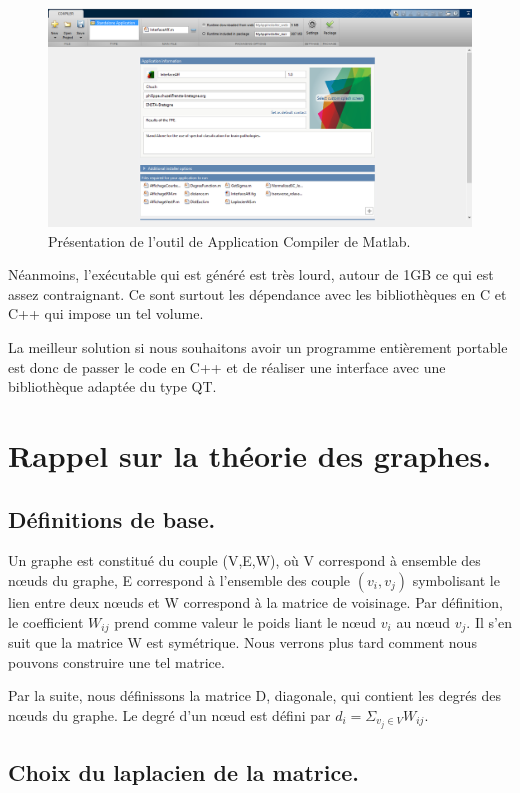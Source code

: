 \begin{figure}[H]
\centering
    \includegraphics[scale=0.4,angle=0]{Images/StandAlone.png}
    \caption{Présentation de l'outil de Application Compiler de Matlab.}
    \label{fig:Compiler}
\end{figure} 

Néanmoins, l'exécutable qui est généré est très lourd, autour de 1GB ce qui est assez contraignant. Ce sont surtout les dépendance avec les bibliothèques en C et C++ qui impose un tel volume.

La meilleur solution si nous souhaitons avoir un programme entièrement portable est donc de passer le code en C++ et de réaliser une interface avec une bibliothèque adaptée du type QT.

\chapter{Rappel sur la théorie des graphes.}

\section{Définitions de base.}

Un graphe est constitué du couple (V,E,W), où V correspond à ensemble des nœuds du graphe, E correspond à l'ensemble des couple $(v_i,v_j)$ symbolisant le lien entre deux nœuds et W correspond à la matrice de voisinage. Par définition, le coefficient $W_{ij}$ prend comme valeur le poids liant le nœud $v_i$ au nœud $v_j$. Il s'en suit que la matrice W est symétrique. Nous verrons plus tard comment nous pouvons construire une tel matrice.


Par la suite, nous définissons la matrice D, diagonale, qui contient les degrés des nœuds du graphe. Le degré d'un nœud est défini par $d_i = \Sigma_{v_j \in V} W_{ij}$. 
\section{Choix du laplacien de la matrice.}

